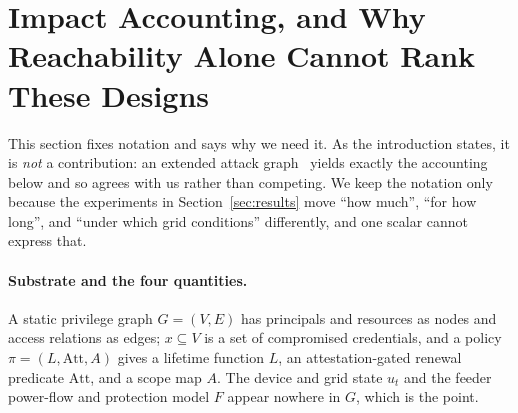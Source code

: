 \section{Impact Accounting, and Why Reachability Alone Cannot Rank These Designs}\label{sec:formalism}

This section fixes notation and says why we need it. As the introduction states, it is \emph{not} a
contribution: an extended attack
graph~\cite{poolsappasit2012dynamic,wang2008attackgraph,frigault2008measuring} yields exactly the
accounting below and so agrees with us rather than competing. We keep the notation only because the
experiments in Section~\ref{sec:results} move ``how much'', ``for how long'', and ``under which grid
conditions'' differently, and one scalar cannot express that.

\paragraph{Substrate and the four quantities.}
A static privilege graph $G=(V,E)$ has principals and resources as nodes and access relations as
edges; $x \subseteq V$ is a set of compromised credentials, and a policy $\pi=(L,\mathrm{Att},A)$
gives a lifetime function $L$, an attestation-gated renewal predicate $\mathrm{Att}$, and a scope
map $A$. The device and grid state $u_t$ and the feeder power-flow and protection model $F$ appear
nowhere in $G$, which is the point.


